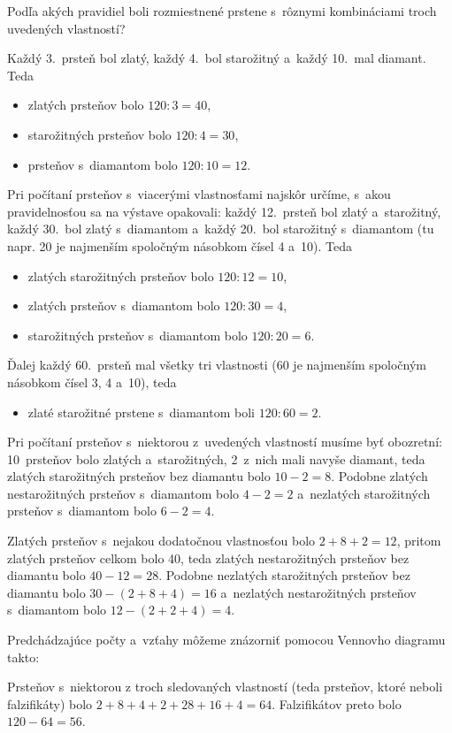 {%
\napad
Podľa akých pravidiel boli rozmiestnené prstene s~rôznymi kombináciami troch uvedených vlastností?

\riesenie
Každý 3.~prsteň bol zlatý, každý 4.~bol starožitný a~každý 10.~mal diamant.
Teda
\begin{itemize}
\item zlatých prsteňov bolo $120:3=40$,
\item starožitných prsteňov bolo $120:4=30$,
\item prsteňov s~diamantom bolo $120:10=12$.
\end{itemize}

Pri počítaní prsteňov s~viacerými vlastnosťami najskôr určíme, s~akou pravidelnosťou sa na výstave opakovali:
každý 12.~prsteň bol zlatý a~starožitný, každý 30.~bol zlatý s~diamantom a~každý 20.~bol starožitný s~diamantom (tu napr. 20 je najmenším spoločným násobkom čísel 4 a~10).
Teda
\begin{itemize}
\item zlatých starožitných prsteňov bolo $120:12=10$,
\item zlatých prsteňov s~diamantom bolo $120:30=4$,
\item starožitných prsteňov s~diamantom bolo $120:20=6$.
\end{itemize}
Ďalej každý 60.~prsteň mal všetky tri vlastnosti (60 je najmenším spoločným násobkom čísel 3, 4 a~10), teda
\begin{itemize}
\item zlaté starožitné prstene s~diamantom boli $120:60=2$.
\end{itemize}

Pri počítaní prsteňov s~niektorou z~uvedených vlastností musíme byť obozretní:
10~prsteňov bolo zlatých a~starožitných, 2~z~nich mali navyše diamant, teda zlatých starožitných prsteňov bez diamantu bolo $10-2=8$.
Podobne zlatých nestarožitných prsteňov s~diamantom bolo $4-2=2$ a~nezlatých starožitných prsteňov s~diamantom bolo $6-2=4$.

Zlatých prsteňov s~nejakou dodatočnou vlastnosťou bolo $2+8+2=12$, pritom zlatých prsteňov celkom bolo 40, teda zlatých nestarožitných prsteňov bez diamantu bolo $40-12=28$.
Podobne nezlatých starožitných prsteňov bez diamantu bolo $30-{(2+8+4)}=16$ a~nezlatých nestarožitných prsteňov s~diamantom bolo ${12-{(2+2+4)}}=4$.

Predchádzajúce počty a~vzťahy môžeme znázorniť pomocou Vennovho diagramu takto:
%


Prsteňov s~niektorou z troch sledovaných vlastností (teda prsteňov, ktoré neboli falzifikáty) bolo $2+8+4+2+28+16+4=64$.
Falzifikátov preto bolo $120-64=56$.

}
